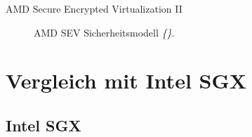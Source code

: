 \documentclass{sdqbeamer}
\begin{document}
\begin{frame}{AMD Secure Encrypted Virtualization II}
\begin{minipage}{0.39\linewidth}
\begin{figure}[!h]
			\caption{AMD SEV Sicherheitsmodell \textit{\{\cite{kaplan}\}}. }
		\end{figure}
	\end{minipage}
\end{frame}


\section{Vergleich mit Intel SGX}

\subsection{Intel SGX}
\end{document}

